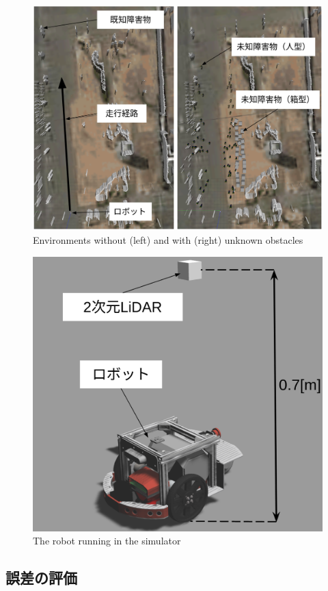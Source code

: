 \documentclass{jarticle}
\begin{document}
\begin{figure}[htbp]
  \centering
   \includegraphics[width=1.0\linewidth]{fig/environment_comparison.png}
	\caption{Environments without (left) and with (right) unknown obstacles}
   \label{fig:つくばチャレンジ人混みシミュレータ}
\end{figure}

\begin{figure}[htbp]
  \centering
   \includegraphics[width=0.5\linewidth]{fig/raspicat_gazebo.png}
   \caption{The robot running in the simulator}
   \label{fig:raspicat}
\end{figure}

\subsection{誤差の評価}
\end{document}
